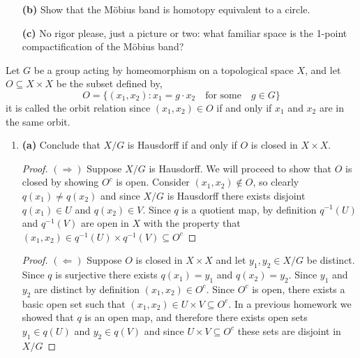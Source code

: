 \documentclass{homework651}
\begin{document}
\begin{problems}
\begin{enumerate}
    \begin{proof} Let $M$ be the quotient of $[0, 1] \times \RR$ where $(0, y) \sim (1, -y)$.
        First we will shoe that $M$ is locally euclidean dimension-$2$.
    \end{proof}

    \item[\textbf{(b)}] Show that the Möbius band is homotopy equivalent to a circle. 
    \item[\textbf{(c)}] No rigor please, just a picture or two: what familiar space is the 1-point compactification
    of the Möbius band?  
\end{enumerate}


\problem Let $G$ be a group acting by homeomorphism on a topological space $X$, and let $O \subseteq X \times X$
be the subset defined by, 
\begin{equation*}
    O = \{(x_1, x_2): x_1 = g \cdot x_2 \quad \text{for some}\quad g \in G\}
\end{equation*}
it is called the orbit relation since $(x_1, x_2) \in O$ if and only if $x_1$ and $x_2$ are in the same orbit. 

\begin{enumerate}
    \item{\textbf{(a)}} Conclude that $X/G$ is Hausdorff if and only if $O$ is closed in $X \times X$. 
    \begin{proof}$(\Rightarrow)$ Suppose $X/G$ is Hausdorff. We will proceed to show that 
        $O$ is closed by showing $O^c$ is open. Consider $(x_1, x_2) \not\in O$, so clearly $q(x_1) \neq q(x_2)$
        and since $X/G$ is Hausdorff there exists disjoint $q(x_1) \in U$ and $q(x_2) \in V$. Since $q$ is a quotient
        map, by definition $q^{-1}(U)$ and $q^{-1}(V)$ are open in $X$ with the property that $(x_1, x_2) \in q^{-1}(U) \times q^{-1}(V) \subseteq O^c$
    \end{proof}

    \begin{proof}$(\Leftarrow)$ Suppose $O$ is closed in $X \times X$ and let $y_1, y_2 \in X/G$ be distinct. Since 
        $q$ is surjective there exists $q(x_1) = y_1$ and $q(x_2) = y_2$. Since $y_1$ and $y_2$ are distinct by definition 
        $(x_1, x_2) \in O^c$. Since $O^c$ is open, there exists a basic open set such that  $(x_1, x_2) \in U \times V \subseteq O^c$. 
        In a previous homework we showed that $q$ is an open map, and therefore there exists open sets $y_1 \in q(U)$ and $y_2 \in q(V)$
        and since $U \times V \subseteq O^c$ these sets are disjoint in $X/G$
    \end{proof}


\end{enumerate}
\end{problems}
\end{document}
